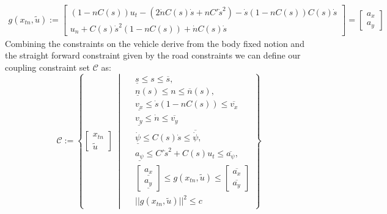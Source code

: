 \begin{align}
	g(x_{tn}, \tilde{u}) :=
	\begin{bmatrix}
		(1 - nC(s)) u_t - (2\dot{n}C(s)\dot{s} + nC' \dot{s}^2) -\dot{s}(1-nC(s))C(s)\dot{s} \\
		u_n + C(s) \dot{s}^2 (1 - nC(s)) +  \dot{n}C(s)\dot{s}
	\end{bmatrix}  = \begin{bmatrix}
		                 a_x \\
		                 a_y
	                 \end{bmatrix}
\end{align}
Combining the constraints on the vehicle derive from the body fixed notion and the straight forward constraint given by the road constraints we can define our coupling constraint set $\mathcal{C}$ as:
\begin{equation}
	\mathcal{C} := \left\{
	\begin{bmatrix} x_{tn} \\ \tilde{u} \end{bmatrix} \; \middle|\;
	\begin{aligned}
		 & \underline{s} \leq s \leq \overline{s},                                     \\
		 & \underline{n}(s) \leq n \leq \overline{n}(s),                               \\
		 & \underline{v_x}  \leq  \dot{s}(1-nC(s))  \leq  \overline{v_x}               \\
		 & \underline{v_y} \leq \dot{n} \leq \overline{v_y}                            \\
		 & \underline{\dot{\psi}} \leq C(s) \dot{s} \leq \overline{\dot{\psi}},        \\
		 & \underline{a_{\psi}} \leq C' \dot{s}^2 + C(s) u_t \leq \overline{a_{\psi}}, \\
		 & \begin{bmatrix}
			   \underline{a_x} \\ \underline{a_y}
		   \end{bmatrix} \leq g(x_{tn}, \tilde{u}) \leq \begin{bmatrix}
			                                                \overline{a_x} \\\overline{a_y}
		                                                \end{bmatrix} \\
		 & ||g(x_{tn}, \tilde{u})||^2 \leq c
	\end{aligned}
	\right\}
\end{equation}

